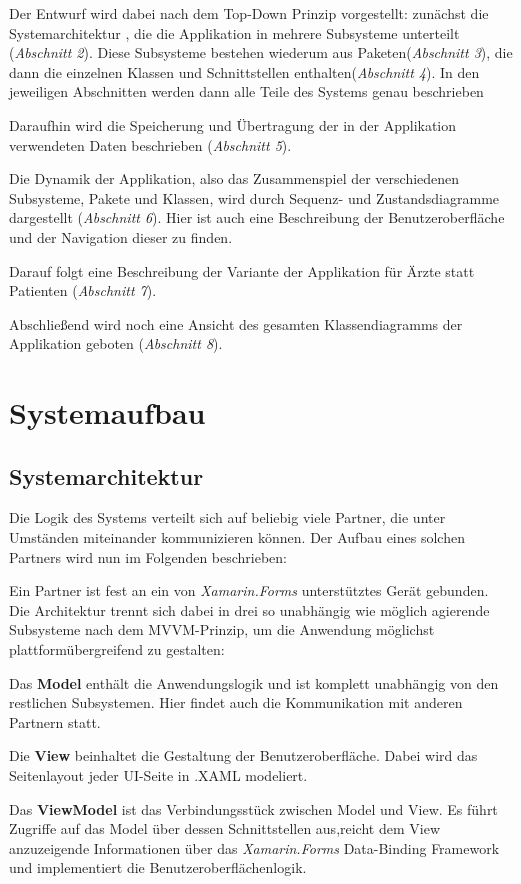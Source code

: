\documentclass[a4paper]{scrreprt}
\begin{document}
Der Entwurf wird dabei nach dem Top-Down Prinzip vorgestellt: zunächst die Systemarchitektur , die die Applikation in mehrere Subsysteme unterteilt (\textit{Abschnitt 2}). Diese Subsysteme bestehen wiederum aus Paketen(\textit{Abschnitt 3}), die dann die einzelnen Klassen und Schnittstellen enthalten(\textit{Abschnitt 4}). In den jeweiligen Abschnitten werden dann alle Teile des Systems genau beschrieben

Daraufhin wird die Speicherung und Übertragung der in der Applikation verwendeten Daten beschrieben (\textit{Abschnitt 5}).

Die Dynamik der Applikation, also das Zusammenspiel der verschiedenen Subsysteme, Pakete und Klassen, wird durch Sequenz- und Zustandsdiagramme dargestellt (\textit{Abschnitt 6}). Hier ist auch eine Beschreibung der Benutzeroberfläche und der Navigation dieser zu finden.

Darauf folgt eine Beschreibung der Variante der Applikation für Ärzte statt Patienten (\textit{Abschnitt 7}).

Abschließend wird noch eine Ansicht des gesamten Klassendiagramms der Applikation geboten (\textit{Abschnitt 8}).

\chapter{Systemaufbau}
\section{Systemarchitektur}
Die Logik des Systems verteilt sich auf beliebig viele Partner, die unter Umständen miteinander kommunizieren können. Der Aufbau eines solchen Partners wird nun im Folgenden beschrieben:

Ein Partner ist fest an ein von \textit{Xamarin.Forms} unterstütztes Gerät gebunden. Die Architektur trennt sich dabei in drei so unabhängig wie möglich agierende Subsysteme nach dem MVVM-Prinzip, um die Anwendung möglichst plattformübergreifend zu gestalten:

Das \textbf{Model} enthält die Anwendungslogik und ist komplett unabhängig von den restlichen Subsystemen. Hier findet auch die Kommunikation mit anderen Partnern statt.

Die \textbf{View} beinhaltet die Gestaltung der Benutzeroberfläche. Dabei wird das Seitenlayout jeder UI-Seite in .XAML modeliert.

Das \textbf{ViewModel} ist das Verbindungsstück zwischen Model und View. Es führt Zugriffe auf das Model über dessen Schnittstellen aus,reicht dem View anzuzeigende Informationen über das \textit{Xamarin.Forms} Data-Binding Framework und implementiert die Benutzeroberflächenlogik.
\end{document}
